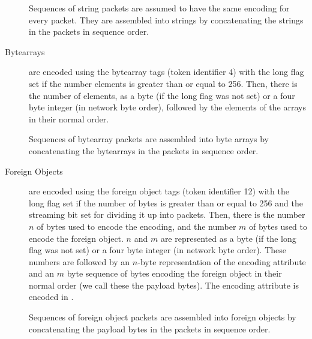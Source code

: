 \begin{description}
    Sequences of string packets are assumed to have the same encoding for every
    packet. They are assembled into strings by concatenating the strings in the packets in
    sequence order.
  \item[Bytearrays] are encoded using the bytearray tags (token identifier 4) with the
    long flag set if the number elements is greater than or equal to 256. Then, there is
    the number of elements, as a byte (if the long flag was not set) or a four byte
    integer (in network byte order), followed by the elements of the arrays in their
    normal order.

    Sequences of bytearray packets are assembled into byte arrays by concatenating the
    bytearrays in the packets in sequence order.
  \item[Foreign Objects] are encoded using the foreign object tags (token identifier 12)
    with the long flag set if the number of bytes is greater than or equal to 256 and the
    streaming bit set for dividing it up into packets. Then, there is the number
    $n$ of bytes used to encode the encoding, and the number
    $m$ of bytes used to encode the foreign
    object. $n$ and $m$ are represented as a byte
    (if the long flag was not set) or a four byte integer (in network byte order). These
    numbers are followed by an $n$-byte representation of the encoding
    attribute and an $m$ byte sequence of bytes encoding the foreign
    object in their normal order (we call these the payload bytes). The encoding attribute
    is encoded in .

    Sequences of foreign object packets are assembled into foreign objects by
    concatenating the payload bytes in the packets in sequence order.


\end{description}
